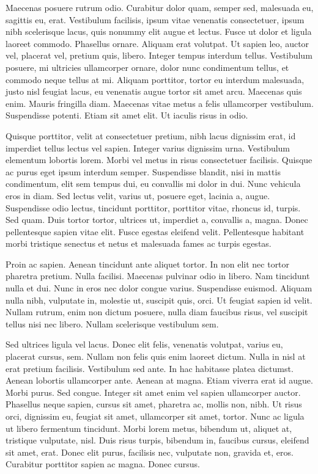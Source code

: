 Maecenas posuere rutrum odio. Curabitur dolor quam, semper sed, malesuada eu, sagittis eu, erat. Vestibulum facilisis, ipsum vitae venenatis consectetuer, ipsum nibh scelerisque lacus, quis nonummy elit augue et lectus. Fusce ut dolor et ligula laoreet commodo. Phasellus ornare. Aliquam erat volutpat. Ut sapien leo, auctor vel, placerat vel, pretium quis, libero. Integer tempus interdum tellus. Vestibulum posuere, mi ultricies ullamcorper ornare, dolor nunc condimentum tellus, et commodo neque tellus at mi. Aliquam porttitor, tortor eu interdum malesuada, justo nisl feugiat lacus, eu venenatis augue tortor sit amet arcu. Maecenas quis enim. Mauris fringilla diam. Maecenas vitae metus a felis ullamcorper vestibulum. Suspendisse potenti. Etiam sit amet elit. Ut iaculis risus in odio.

Quisque porttitor, velit at consectetuer pretium, nibh lacus dignissim erat, id imperdiet tellus lectus vel sapien. Integer varius dignissim urna. Vestibulum elementum lobortis lorem. Morbi vel metus in risus consectetuer facilisis. Quisque ac purus eget ipsum interdum semper. Suspendisse blandit, nisi in mattis condimentum, elit sem tempus dui, eu convallis mi dolor in dui. Nunc vehicula eros in diam. Sed lectus velit, varius ut, posuere eget, lacinia a, augue. Suspendisse odio lectus, tincidunt porttitor, porttitor vitae, rhoncus id, turpis. Sed quam. Duis tortor tortor, ultrices ut, imperdiet a, convallis a, magna. Donec pellentesque sapien vitae elit. Fusce egestas eleifend velit. Pellentesque habitant morbi tristique senectus et netus et malesuada fames ac turpis egestas.

Proin ac sapien. Aenean tincidunt ante aliquet tortor. In non elit nec tortor pharetra pretium. Nulla facilisi. Maecenas pulvinar odio in libero. Nam tincidunt nulla et dui. Nunc in eros nec dolor congue varius. Suspendisse euismod. Aliquam nulla nibh, vulputate in, molestie ut, suscipit quis, orci. Ut feugiat sapien id velit. Nullam rutrum, enim non dictum posuere, nulla diam faucibus risus, vel suscipit tellus nisi nec libero. Nullam scelerisque vestibulum sem.

Sed ultrices ligula vel lacus. Donec elit felis, venenatis volutpat, varius eu, placerat cursus, sem. Nullam non felis quis enim laoreet dictum. Nulla in nisl at erat pretium facilisis. Vestibulum sed ante. In hac habitasse platea dictumst. Aenean lobortis ullamcorper ante. Aenean at magna. Etiam viverra erat id augue. Morbi purus. Sed congue. Integer sit amet enim vel sapien ullamcorper auctor. Phasellus neque sapien, cursus sit amet, pharetra ac, mollis non, nibh. Ut risus orci, dignissim eu, feugiat sit amet, ullamcorper sit amet, tortor. Nunc ac ligula ut libero fermentum tincidunt. Morbi lorem metus, bibendum ut, aliquet at, tristique vulputate, nisl. Duis risus turpis, bibendum in, faucibus cursus, eleifend sit amet, erat. Donec elit purus, facilisis nec, vulputate non, gravida et, eros. Curabitur porttitor sapien ac magna. Donec cursus.

